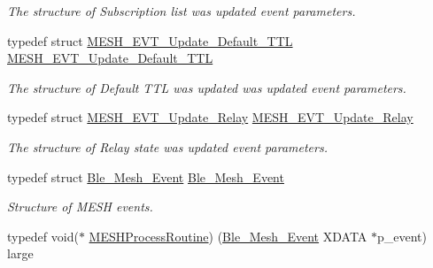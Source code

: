 \begin{DoxyCompactItemize}
\begin{DoxyCompactList}\small\item\em The structure of Subscription list was updated event parameters. \end{DoxyCompactList}\item 
typedef struct \hyperlink{struct_m_e_s_h___e_v_t___update___default___t_t_l}{M\+E\+S\+H\+\_\+\+E\+V\+T\+\_\+\+Update\+\_\+\+Default\+\_\+\+T\+TL} \hyperlink{group___m_e_s_h_ga8207cdb525f56e317a7a9f48eb2f1eeb}{M\+E\+S\+H\+\_\+\+E\+V\+T\+\_\+\+Update\+\_\+\+Default\+\_\+\+T\+TL}\hypertarget{group___m_e_s_h_ga8207cdb525f56e317a7a9f48eb2f1eeb}{}\label{group___m_e_s_h_ga8207cdb525f56e317a7a9f48eb2f1eeb}

\begin{DoxyCompactList}\small\item\em The structure of Default T\+TL was updated was updated event parameters. \end{DoxyCompactList}\item 
typedef struct \hyperlink{struct_m_e_s_h___e_v_t___update___relay}{M\+E\+S\+H\+\_\+\+E\+V\+T\+\_\+\+Update\+\_\+\+Relay} \hyperlink{group___m_e_s_h_ga5c5d3d84371093b7dd9a23d1e8a283a7}{M\+E\+S\+H\+\_\+\+E\+V\+T\+\_\+\+Update\+\_\+\+Relay}\hypertarget{group___m_e_s_h_ga5c5d3d84371093b7dd9a23d1e8a283a7}{}\label{group___m_e_s_h_ga5c5d3d84371093b7dd9a23d1e8a283a7}

\begin{DoxyCompactList}\small\item\em The structure of Relay state was updated event parameters. \end{DoxyCompactList}\item 
typedef struct \hyperlink{struct_ble___mesh___event}{Ble\+\_\+\+Mesh\+\_\+\+Event} \hyperlink{group___m_e_s_h_ga0063f85a114c5b2b0b5d54fe0bec98c7}{Ble\+\_\+\+Mesh\+\_\+\+Event}\hypertarget{group___m_e_s_h_ga0063f85a114c5b2b0b5d54fe0bec98c7}{}\label{group___m_e_s_h_ga0063f85a114c5b2b0b5d54fe0bec98c7}

\begin{DoxyCompactList}\small\item\em Structure of M\+E\+SH events. \end{DoxyCompactList}\item 
typedef void($\ast$ \hyperlink{group___m_e_s_h_ga46ab9a569a5fb649c1c0246cb81b3389}{M\+E\+S\+H\+Process\+Routine}) (\hyperlink{struct_ble___mesh___event}{Ble\+\_\+\+Mesh\+\_\+\+Event} X\+D\+A\+TA $\ast$p\+\_\+event) large\hypertarget{group___m_e_s_h_ga46ab9a569a5fb649c1c0246cb81b3389}{}\label{group___m_e_s_h_ga46ab9a569a5fb649c1c0246cb81b3389}


\end{DoxyCompactItemize}
